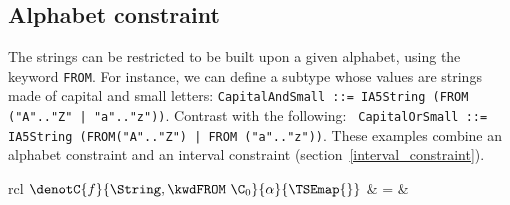 
\subsection{Alphabet constraint}\label{alphabet_constraint}

The strings can be restricted to be built upon a given alphabet, using
the keyword \texttt{\small FROM}. For instance, we can define a
subtype whose values are strings made of capital and small letters:
\texttt{\small CapitalAndSmall ::= IA5String (FROM ("A".."Z" |
  "a".."z"))}. Contrast with the following: \texttt{\small
  CapitalOrSmall ::= IA5String (FROM("A".."Z") | FROM
  ("a".."z"))}. These examples combine an alphabet constraint and an
interval constraint (section~\ref{interval_constraint}).

\medskip

\noindent
\begin{tabular}{rcl}
    $\denotC{f}{\String,\kwdFROM \,\, \C_0}{\alpha}{\TSEmap{}}$
  & \hspace*{-4mm} = & \\
\end{tabular}

\medskip

